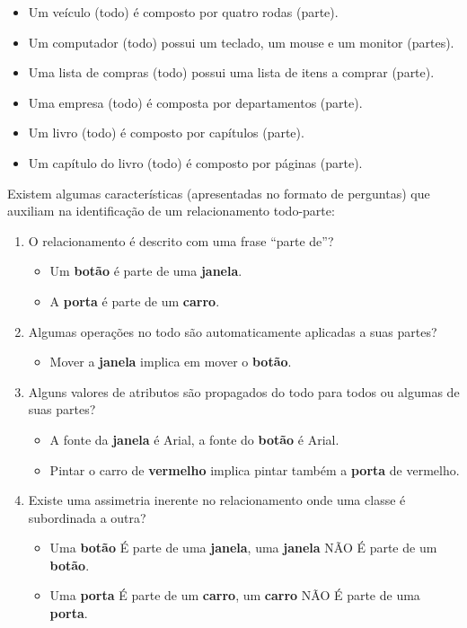 \begin{itemize}
	\item Um veículo (todo) é composto por quatro rodas (parte).
	\item Um computador (todo) possui um teclado, um mouse e um monitor (partes).
	\item Uma lista de compras (todo) possui uma lista de itens a comprar (parte).
	\item Uma empresa (todo) é composta por departamentos (parte).
	\item Um livro (todo) é composto por capítulos (parte).
	\item Um capítulo do livro (todo) é composto por páginas (parte).
\end{itemize}

Existem algumas características (apresentadas no formato de perguntas) que auxiliam na identificação de um relacionamento todo-parte:

\begin{enumerate}
\item O relacionamento é descrito com uma frase ``parte de''?
	\begin{itemize}
		\item Um \textbf{botão} é parte de uma \textbf{janela}.
		\item A \textbf{porta} é parte de um \textbf{carro}.
	\end{itemize}
	
\item Algumas operações no todo são automaticamente aplicadas a suas partes?
\begin{itemize}
	\item Mover a \textbf{janela} implica em mover o \textbf{botão}.
\end{itemize}

\item Alguns valores de atributos são propagados do todo para todos ou algumas de suas partes?
\begin{itemize}
	\item A fonte da \textbf{janela} é Arial, a fonte do \textbf{botão} é Arial.
	\item Pintar o carro de \textbf{vermelho} implica pintar também a \textbf{porta} de vermelho.
\end{itemize}

\item Existe uma assimetria inerente no relacionamento onde uma classe é subordinada a outra?
\begin{itemize}
	\item Uma \textbf{botão} É parte de uma \textbf{janela}, uma \textbf{janela} NÃO É parte de um \textbf{botão}.
	\item Uma \textbf{porta} É parte de um \textbf{carro}, um \textbf{carro} NÃO É parte de uma \textbf{porta}.
\end{itemize}
\end{enumerate}


